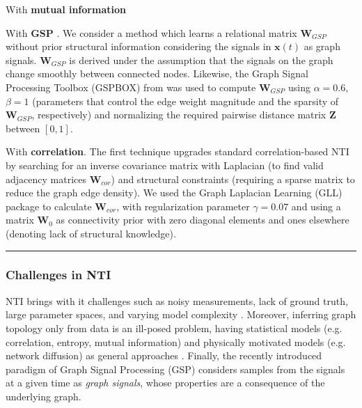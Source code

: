 With \textbf{mutual information} \cite{Villaverde2014MIDERnetworkinference}

With \textbf{GSP} \cite{Dong2019Learninggraphsdata}. We consider a method \cite{Kalofolias2016Howlearngraph} which learns a relational matrix $ \bm{W}_{GSP} $ without prior structural information considering the signals in $\bm{x}(t) $ as graph signals\cite{Dong2019Learninggraphsdata}. $ \bm{W}_{GSP} $ is derived under the assumption that the signals on the graph change smoothly between connected nodes. Likewise, the Graph Signal Processing Toolbox (GSPBOX) from \cite{Perraudin2014GSPBOXtoolboxsignal} was used to compute $ \bm{W}_{GSP} $ using $\alpha = 0.6$, $\beta  = 1$ (parameters that control the edge weight magnitude and the sparsity of $ \bm{W}_{GSP} $, respectively) and normalizing the required pairwise distance matrix $\bm{Z}$ between $[0,1]$.

With \textbf{correlation}. The first technique \cite{Olsson2006unknownsensorsactuators} upgrades standard correlation-based NTI by searching for an inverse covariance matrix with Laplacian (to find valid adjacency matrices $ \bm{W}_{cor} $) and structural constraints (requiring a sparse matrix to reduce the graph edge density). We used the Graph Laplacian Learning (GLL) package \cite{Egilmez2021GraphLaplacianLearning} to calculate $ \bm{W}_{cor} $, with regularization parameter $\gamma = 0.07$ and using a matrix $\bm{W}_0$ as connectivity prior with zero diagonal elements and ones elsewhere (denoting lack of structural knowledge).










\hrule

\subsubsection{Challenges in NTI}
NTI brings with it challenges such as noisy measurements, lack of ground truth, large parameter spaces, and varying model complexity \cite{Brugere2018Networkstructureinference}. Moreover, inferring graph topology only from data is an ill-posed problem, having statistical models (e.g. correlation, entropy, mutual information) and physically motivated models (e.g. network diffusion) as general approaches \cite{Dong2019Learninggraphsdata}. %
Finally, the recently introduced paradigm of Graph Signal Processing (GSP) \cite{Stankovic2019Introductiongraphsignal} considers samples from the signals at a given time as \emph{graph signals}, whose properties are a consequence of the underlying graph. %


